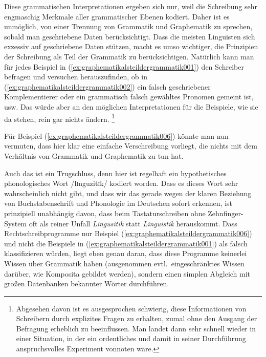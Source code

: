Diese grammatischen Interpretationen ergeben sich nur, weil die Schreibung sehr engmaschig Merkmale aller grammatischer Ebenen kodiert.
Daher ist es unmöglich, von einer Trennung von Grammatik und Graphematik zu sprechen, sobald man geschriebene Daten berücksichtigt.
Dass die meisten Linguisten sich exzessiv auf geschriebene Daten stützen, macht es umso wichtiger, die Prinzipien der Schreibung als Teil der Grammatik zu berücksichtigen.
Natürlich kann man für jedes Beispiel in (\ref{ex:graphematikalsteildergrammatik001}) den Schreiber befragen und versuchen herauszufinden, ob in (\ref{ex:graphematikalsteildergrammatik002}) ein falsch geschriebener Komplementierer oder ein grammatisch falsch gewähltes Pronomen gemeint ist, usw.
Das würde aber an den möglichen Interpretationen für die Beispiele, wie sie da stehen, rein gar nichts ändern.%
\footnote{Abgesehen davon ist es ausgesprochen schwierig, diese Informationen von Schreibern durch explizites Fragen zu erhalten, zumal ohne den Ausgang der Befragung erheblich zu beeinflussen.
Man landet dann sehr schnell wieder in einer Situation, in der ein ordentliches und damit in seiner Durchführung anspruchsvolles Experiment vonnöten wäre.}

Für Beispiel (\ref{ex:graphematikalsteildergrammatik006}) könnte man nun vermuten, dass hier klar eine einfache Verschreibung vorliegt, die nichts mit dem Verhältnis von Grammatik und Graphematik zu tun hat.

\begin{exe}
\end{exe}

Auch das ist ein Trugschluss, denn hier ist regelhaft ein hypothetisches phonologisches Wort /lɪnguzitɪk/ kodiert worden.
Dass es dieses Wort sehr wahrscheinlich nicht gibt, und dass wir das gerade wegen der klaren Beziehung von Buchstabenschrift und Phonologie im Deutschen sofort erkennen, ist prinzipiell unabhängig davon, dass beim Tastaturschreiben ohne Zehnfinger-System oft als reiner Unfall \textit{Lingusitik} statt \textit{Linguistik} herauskommt.
Dass Rechtschreibprogramme nur Beispiel (\ref{ex:graphematikalsteildergrammatik006}) und nicht die Beispiele in (\ref{ex:graphematikalsteildergrammatik001}) als falsch klassifizieren würden, liegt eben genau daran, dass diese Programme keinerlei Wissen über Grammatik haben (ausgenommen evtl.\ eingeschränktes Wissen darüber, wie Komposita gebildet werden), sondern einen simplen Abgleich mit großen Datenbanken bekannter Wörter durchführen.

